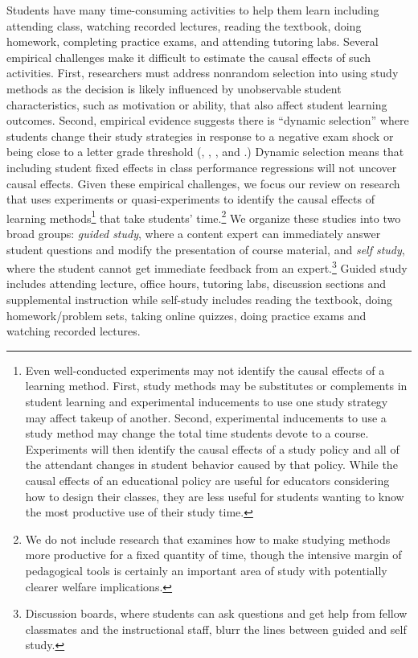 \documentclass[12pt]{article}
\begin{document}
Students have many time-consuming activities to help them learn including attending class, watching recorded lectures, reading the textbook, doing homework, completing practice exams, and attending tutoring labs.
Several empirical challenges make it difficult to estimate the causal effects of such activities.
First, researchers must address nonrandom selection into using study methods as the decision is likely influenced by unobservable student characteristics, such as motivation or ability, that also affect student learning outcomes.
Second, empirical evidence suggests there is ``dynamic selection'' where students change their study strategies in response to a negative exam shock or being close to a letter grade threshold (\textcite{oettinger2002}, \textcite{ko2005}, \textcite{ss2008}, \textcite{bo2012} and \textcite{bo2015}.) Dynamic selection means that including student fixed effects in class performance regressions will not uncover causal effects.
Given these empirical challenges, we focus our review on research that uses experiments or quasi-experiments to identify the causal effects of learning methods\footnote{Even well-conducted experiments may not identify the causal effects of a learning method.  First, study methods may be substitutes or complements in student learning and experimental inducements to use one study strategy may affect takeup of another.  Second, experimental inducements to use a study method may change the total time students devote to a course. Experiments will then identify the causal effects of a study policy and all of the attendant changes in student behavior caused by that policy. While the causal effects of an educational policy are useful for educators considering how to design their classes, they are less useful for students wanting to know the most productive use of their study time.} that take students' time.\footnote{We do not include research that examines how to make studying methods more productive for a fixed quantity of time, though the intensive margin of pedagogical tools is certainly an important area of study with potentially clearer welfare implications.} We organize these studies into two broad groups: \textit{guided study}, where a content expert can immediately answer student questions and modify the presentation of course material, and \textit{self study}, where the student cannot get immediate feedback from an expert.\footnote{Discussion boards, where students can ask questions and get help from fellow classmates and the instructional staff, blurr the lines between guided and self study.}  Guided study includes attending lecture, office hours, tutoring labs, discussion sections and supplemental instruction while self-study includes reading the textbook, doing homework/problem sets, taking online quizzes, doing practice exams and watching recorded lectures.
\end{document}
